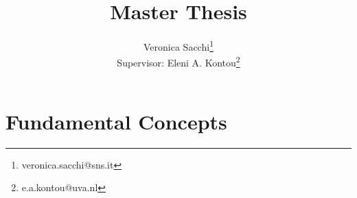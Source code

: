 \documentclass[12pt, a4paper]{book}
\title{Master Thesis}
\author{Veronica Sacchi\thanks{veronica.sacchi@sns.it}\\
Supervisor: Eleni A. Kontou\thanks{e.a.kontou@uva.nl}}
\begin{document}
\maketitle

\tableofcontents
\clearpage

\chapter{Fundamental Concepts}

\clearpage
\end{document}
